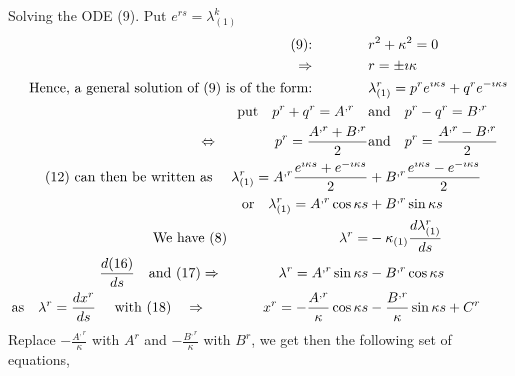 Solving the ODE (9). Put $ e^{rs} = \lambda_{(1)}^k$
\begin{align}
\text{(9):}\quad\quad\quad\quad&  r^2 + \kappa^2 = 0\\
\Rightarrow \quad\quad\quad\quad & r = \pm \imath \kappa\\
\text{Hence, a general solution of (9) is of the form:} \quad\quad\quad\quad & \lambda_{(1)}^r = p^r e^{ \imath \kappa s}  + q^r e^{ -\imath \kappa s}\\
\text{put}\quad  p^r+q^r = A^{,r}\quad &\text{and}\quad p^r-q^r = B^{,r}\\
\Leftrightarrow \quad\quad\quad\quad p^r = \frac{A^{,r}+B^{,r}}{2} &\text{and}\quad p^r=\frac{A^{,r}-B^{,r}}{2}\\
\text{(12) can then be written as }\quad  \lambda_{(1)}^r = A^{,r}\frac{ e^{ \imath \kappa s}+  e^{ -\imath \kappa s}}{2} & + B^{,r}\frac{ e^{ \imath \kappa s}- e^{ -\imath \kappa s}}{2}\\
\text{or}\quad  \lambda_{(1)}^r = A^{,r}\cos \kappa s & + B^{,r}\sin \kappa s\\
\text{We have (8)}\quad\quad\quad\quad \quad\quad\quad\quad  \lambda^r =  & -  \kappa_{(1)} \dv{\lambda_{(1)}^r}{ s} \\
\dv{(16)}{s}\quad\text{and (17)}\Rightarrow\quad\quad\quad\quad \lambda^r =  A^{,r}\sin \kappa s & - B^{,r}\cos \kappa s\\
\text{as}\quad \lambda^r = \dv{x^r}{s}\quad\text{ with (18)}\quad \Rightarrow \quad\quad\quad\quad x^r = - \frac{A^{,r}}{\kappa}\cos \kappa s &  - \frac{B^{,r}}{\kappa}\sin \kappa s + C^r\\
\end{align}
Replace $- \frac{A^{,r}}{\kappa}$ with $A^{r}$ and $- \frac{B^{,r}}{\kappa}$ with $B^{r}$, we get then the following set of equations,

